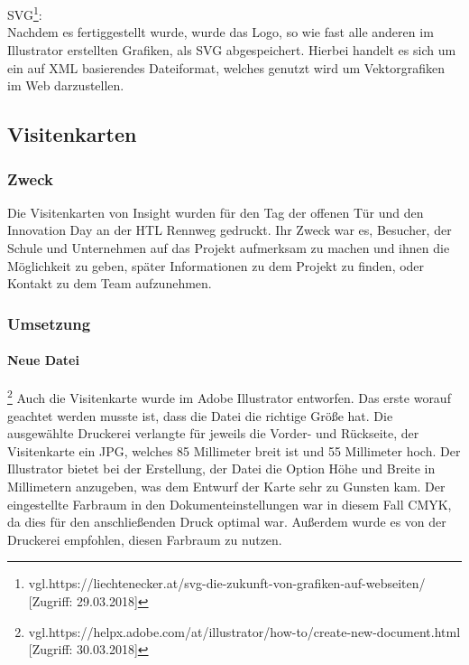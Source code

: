 \leavevmode \\
\leavevmode \\
SVG\footnote{\label{} vgl.https://liechtenecker.at/svg-die-zukunft-von-grafiken-auf-webseiten/ [Zugriff: 29.03.2018]}:
\leavevmode \\
Nachdem es fertiggestellt wurde, wurde das Logo, so wie fast alle anderen im Illustrator erstellten Grafiken, als SVG abgespeichert. Hierbei handelt es sich um ein auf XML basierendes Dateiformat, welches genutzt wird um Vektorgrafiken im Web darzustellen.

\subsection{Visitenkarten}
\subsubsection{Zweck}
Die Visitenkarten von Insight wurden für den Tag der offenen Tür und den Innovation Day an der HTL Rennweg gedruckt. Ihr Zweck war es, Besucher, der Schule und Unternehmen auf das Projekt aufmerksam zu machen und ihnen die Möglichkeit zu geben, später Informationen zu dem Projekt zu finden, oder Kontakt zu dem Team aufzunehmen.
\subsubsection{Umsetzung}

\paragraph{Neue Datei}\footnote{\label{} vgl.https://helpx.adobe.com/at/illustrator/how-to/create-new-document.html [Zugriff: 30.03.2018]}  
Auch die Visitenkarte wurde im Adobe Illustrator entworfen. Das erste worauf geachtet werden musste ist, dass die Datei die richtige Größe hat. Die ausgewählte Druckerei verlangte für jeweils die Vorder- und Rückseite, der Visitenkarte ein JPG, welches 85 Millimeter breit ist und 55 Millimeter hoch. Der Illustrator bietet bei der Erstellung, der Datei die Option Höhe und Breite in Millimetern anzugeben, was dem Entwurf der Karte sehr zu Gunsten kam. Der eingestellte Farbraum in den Dokumenteinstellungen war in diesem Fall CMYK, da dies für den anschließenden Druck optimal war. Außerdem wurde es von der Druckerei empfohlen, diesen Farbraum zu nutzen.

